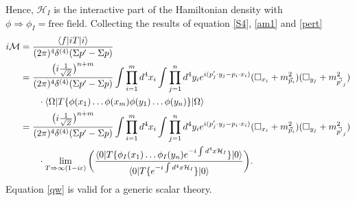 Hence, $\mathcal{H}_I$ is the interactive part of the Hamiltonian density with $\phi\Rightarrow \phi_I=\text{free field}$. Collecting the results of equation \eqref{S4}, \eqref{am1} and \eqref{pert}
\begin{equation}
	\begin{split}
		i\mathcal{M}&=\frac{\braket{f|iT|i}}{(2\pi)^4\delta^{(4)}(\Sigma p'-\Sigma p)}\\
		&=\frac{\big(i\frac{1}{\sqrt{Z}}\big)^{n+m}}{(2\pi)^4\delta^{(4)}(\Sigma p'-\Sigma p)}\int\prod_{i=1}^m d^4x_i\int\prod_{j=1}^n d^4y_ie^{i(p'_j\cdot y_j-p_i\cdot x_i)}(\square _{x_i}+m_{\vec{p}_i}^2)(\square _{y_j}+m_{\vec{p'}_j}^2)\\
		&\qquad \cdot\braket{\Omega|T\{\phi(x_1)\dots\phi(x_m)\phi(y_1)\dots \phi(y_n)\}|\Omega}\\
		&=\frac{\big(i\frac{1}{\sqrt{Z}}\big)^{n+m}}{(2\pi)^4\delta^{(4)}(\Sigma p'-\Sigma p)}\int\prod_{i=1}^m d^4x_i\int\prod_{j=1}^n d^4y_ie^{i(p'_j\cdot y_j-p_i\cdot x_i)}(\square _{x_i}+m_{\vec{p}_i}^2)(\square _{y_j}+m_{\vec{p'}_j}^2)\\
		&\qquad\cdot \lim\limits_{T\Rightarrow \infty (1-i\varepsilon)}\bigg(\frac{\braket{0|T\{\phi_I(x_1)\dots\phi_I(y_n)e^{-i\int d^4x \mathcal{H}_I}\}|0}}{\braket{0|T\{e^{-i\int d^4x \mathcal{H}_I}\}|0}}\bigg). 
	\end{split}
	\label{qw}
\end{equation} 
Equation \eqref{qw} is valid for a generic scalar theory.


